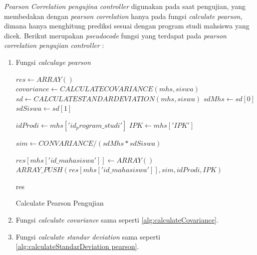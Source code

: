 \textit{Pearson Correlation pengujina controller} digunakan pada saat pengujian, yang membedakan dengan \textit{pearson correlation} hanya pada fungsi \textit{calculate pearson}, dimana hanya menghitung prediksi sesuai dengan program studi mahsiswa yang dicek. Berikut merupakan \textit{pseudocode} fungsi yang terdapat pada \textit{pearson correlation pengujian controller} :

\begin{enumerate}
        \item Fungsi \textit{calculaye pearson} \\
        
        \begin{algorithm}[H]
            \begin{algorithmic}[1]
                    \State $res \gets ARRAY()$
                            \State $covariance \gets CALCULATECOVARIANCE(mhs, siswa)$
                            \State $sd \gets CALCULATESTANDARDEVIATION(mhs,siswa)$
                            \State $sdMhs \gets sd[0]$
                            \State $sdSiswa \gets sd[1]$
                            
                            \State $idProdi \gets mhs['id_program\_studi']$
                            \State $IPK \gets mhs['IPK']$
                            
                            \State $sim \gets CONVARIANCE / (sdMhs * sdSiswa)$
                            
                                \State $res[mhs['id\_mahasiswa']] \gets ARRAY()$
                                \State $ARRAY\_PUSH(res[mhs['id\_mahasiswa']], sim, idProdi, IPK)$
                            \EndIf
                        \EndIf
                    \EndFor
                
                    \State \Return res
                \EndProcedure
            \end{algorithmic} 
            \caption{Calculate Pearson Pengujian}
            \label{alg:calculatePearsonPengujian}
        \end{algorithm}
        
        \item Fungsi \textit{calculate covariance} sama seperti \ref{alg:calculateCovariance}.
        
        \item Fungsi \textit{calculate standar deviation} sama seperti \ref{alg:calculateStandarDeviation pearson}. 
\end{enumerate}


